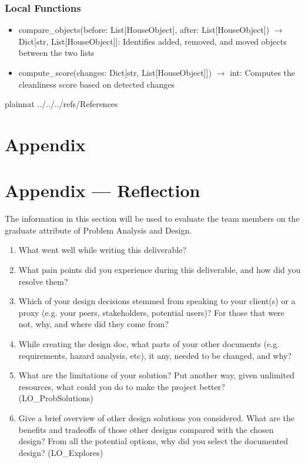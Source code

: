 \documentclass[12pt, titlepage]{article}
\begin{document}
\subsubsection{Local Functions}

\begin{itemize}
  \item compare{\_}objects(before: List[HouseObject], after: List[HouseObject]) $\rightarrow$ Dict[str, List[HouseObject]]: Identifies added, removed, and moved objects between the two lists
  \item compute{\_}score(changes: Dict[str, List[HouseObject]]) $\rightarrow$ int: Computes the cleanliness score based on detected changes
\end{itemize}

\newpage

 {plainnat}
 {../../../refs/References}


\newpage

\section{Appendix} \label{Appendix}


\newpage{}

\section*{Appendix --- Reflection}


The information in this section will be used to evaluate the team members on the
graduate attribute of Problem Analysis and Design.



\begin{enumerate}
  \item What went well while writing this deliverable? 
  \item What pain points did you experience during this deliverable, and how
    did you resolve them?
  \item Which of your design decisions stemmed from speaking to your client(s)
  or a proxy (e.g. your peers, stakeholders, potential users)? For those that
  were not, why, and where did they come from?
  \item While creating the design doc, what parts of your other documents (e.g.
  requirements, hazard analysis, etc), it any, needed to be changed, and why?
  \item What are the limitations of your solution?  Put another way, given
  unlimited resources, what could you do to make the project better? (LO\_ProbSolutions)
  \item Give a brief overview of other design solutions you considered.  What
  are the benefits and tradeoffs of those other designs compared with the chosen
  design?  From all the potential options, why did you select the documented design?
  (LO\_Explores)
\end{enumerate}
\end{document}
